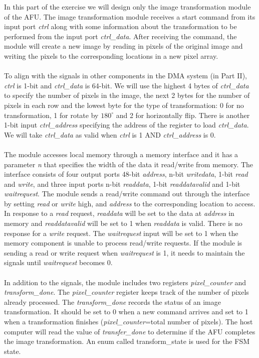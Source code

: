 \documentclass[epsfig,10pt,fullpage]{article}
\begin{document}
\newpage
\noindent
In this part of the exercise we will design only the image transformation module of the AFU.  The image transformation module receives a start command from its input port {\it ctrl} along with some information about the transformation to be performed from the input port {\it ctrl\_data}. After receiving the command, the module will create a new image by reading in pixels of the original image and writing the pixels to the corresponding locations in a new pixel array. \\
\\
To align with the signals in other components in the DMA system (in Part II), \emph{ctrl} is 1-bit and \emph{ctrl\_data} is 64-bit. We will use the highest 4 bytes of \emph{ctrl\_data} to specify the number of pixels in the image, the next 2 bytes for the number of pixels in each row and the lowest byte for the type of transformation: 0 for no transformation, 1 for rotate by $180^\circ$ and 2 for horizontally flip. There is another 1-bit input \emph{ctrl\_address} specifying the address of the register to load \emph{ctrl\_data}.  We will take \emph{ctrl\_data} as valid when \emph{ctrl} is 1 AND \emph{ctrl\_address} is 0. \\
\\
The module accesses local memory through a memory interface and it has a parameter {\it n} that specifies the width of the data it read/write from memory. The interface consists of four output ports 48-bit {\it address}, n-bit {\it writedata}, 1-bit {\it read} and {\it write}, and three input ports n-bit {\it readdata}, 1-bit {\it readdatavalid} and 1-bit {\it waitrequest}. The module sends a read/write command out through the interface by setting {\it read} or {\it write} high, and {\it address} to the corresponding location to access.  In response to a {\it read} request, {\it readdata} will be set to the data at {\it address} in memory and {\it readdatavalid} will be set to 1 when {\it readdata} is valid. There is no response for a {\it write} request. The {\it waitrequest} input will be set to 1 when the memory component is unable to process read/write requests. If the module is sending a read or write request when {\it waitrequest} is 1, it needs to maintain the signals until {\it waitrequest} becomes 0.\\
\\
In addition to the signals, the module includes two registers {\it pixel\_counter} and {\it transform\_done}. The {\it pixel\_counter} register keeps track of the number of pixels already processed. The {\it transform\_done} records the status of an image transformation. It should be set to 0 when a new command arrives and set to 1 when a transformation finishes ({\it pixel\_counter}=total number of pixels). The host computer will read the value of {\it transfer\_done} to determine if the AFU completes the image transformation. An enum called transform\_state is used for the FSM state.\\
\end{document}
